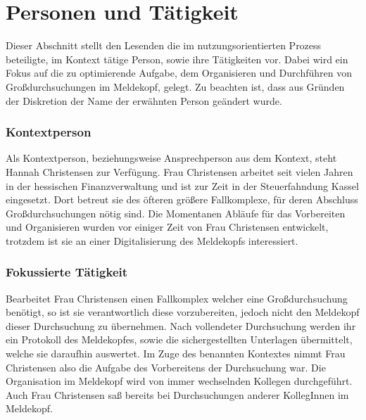 \section{Personen und Tätigkeit}

Dieser Abschnitt stellt den Lesenden die im nutzungsorientierten Prozess beteiligte, im Kontext tätige Person, sowie ihre Tätigkeiten vor.
Dabei wird ein Fokus auf die zu optimierende Aufgabe, dem Organisieren und Durchführen von Großdurchsuchungen im Meldekopf, gelegt.
Zu beachten ist, dass aus Gründen der Diskretion der Name der erwähnten Person geändert wurde.

\subsubsection{Kontextperson}

Als Kontextperson, beziehungsweise Ansprechperson aus dem Kontext, steht Hannah Christensen zur Verfügung.
Frau Christensen arbeitet seit vielen Jahren in der hessischen Finanzverwaltung und ist zur Zeit in der Steuerfahndung Kassel eingesetzt.
Dort betreut sie des öfteren größere Fallkomplexe, für deren Abschluss Großdurchsuchungen nötig sind.
Die Momentanen Abläufe für das Vorbereiten und Organisieren wurden vor einiger Zeit von Frau Christensen entwickelt, trotzdem ist sie an einer Digitalisierung des Meldekopfs interessiert.

\subsubsection{Fokussierte Tätigkeit}

Bearbeitet Frau Christensen einen Fallkomplex welcher eine Großdurchsuchung benötigt, so ist sie verantwortlich diese vorzubereiten, jedoch nicht den Meldekopf dieser Durchsuchung zu übernehmen.
Nach vollendeter Durchsuchung werden ihr ein Protokoll des Meldekopfes, sowie die sichergestellten Unterlagen übermittelt, welche sie daraufhin auswertet.
Im Zuge des benannten Kontextes nimmt Frau Christensen also die Aufgabe des Vorbereitens der Durchsuchung war.
Die Organisation im Meldekopf wird von immer wechselnden Kollegen durchgeführt.
Auch Frau Christensen saß bereits bei Durchsuchungen anderer KollegInnen im Meldekopf.